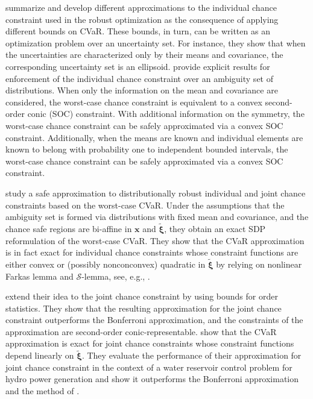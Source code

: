 \documentclass[final,onefignum,onetabnum]{class}
\newcommand{\bs}[1]{\boldsymbol{#1}} %
\newcommand{\Cs}[1]{\mathcal{#1}} %
\newcommand{\txi}{\tilde{\bs{\xi}}}
\begin{document}
\citet{chen2010joint} summarize and develop different
approximations to the individual
chance constraint used in the robust optimization as 
the consequence of applying different bounds on CVaR. These bounds, in turn, can be written as an optimization problem over an uncertainty set.  
For instance, they show that when the uncertainties are characterized
only by their means and covariance, the corresponding uncertainty set is an ellipsoid. 
\citet{calafiore2006} provide
explicit results for enforcement of the individual chance
constraint over an ambiguity set of distributions. When only the information on the mean and covariance are considered, the worst-case chance constraint is equivalent to a convex second-order conic (SOC) constraint. With additional information on the symmetry, the worst-case chance constraint can be safely approximated via a convex SOC constraint. Additionally, when the means are known and individual elements are  known to belong with probability one to independent
bounded intervals, the worst-case chance constraint can be safely approximated via a convex SOC constraint. 

\citet{zymler2013Chance} study a safe approximation to distributionally robust individual and joint chance constraints based on the worst-case CVaR. Under the assumptions that the ambiguity set is formed via distributions with fixed mean and covariance, and the chance safe regions  are bi-affine in $\bs{x}$ and $\txi$, they obtain an exact SDP reformulation of the worst-case CVaR. They show that the CVaR approximation is in fact exact for individual chance constraints
whose constraint functions are either convex or (possibly nonconconvex) quadratic in $\txi$ by relying on nonlinear Farkas lemma and $\Cs{S}$-lemma, see, e.g.,  \citet{polik2007survey}. 

\citet{chen2010joint} extend their idea to the joint chance constraint by using bounds for order statistics. They show that the resulting approximation
for the joint chance constraint outperforms the Bonferroni approximation, and the constraints of the approximation  are
second-order conic-representable. \citet{zymler2013Chance}  show that the  CVaR approximation is exact for joint chance constraints whose constraint functions depend linearly on $\txi$.  They evaluate the performance of their approximation for joint chance constraint in the context of a water reservoir control problem for hydro power generation and show it outperforms the Bonferroni approximation and the method of \citet{chen2010joint}. 
\end{document}
